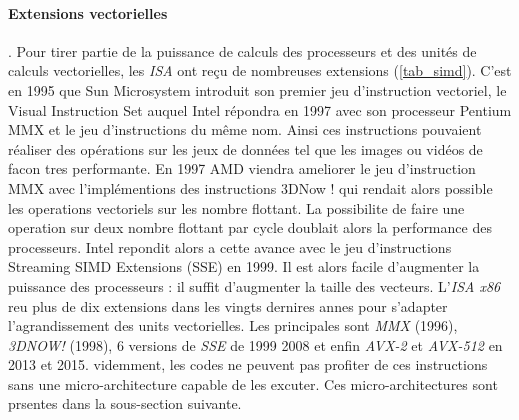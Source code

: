 \paragraph{Extensions vectorielles}.
Pour tirer partie de la puissance de calculs des processeurs et des unités de calculs vectorielles, les \textit{ISA} ont reçu de nombreuses extensions (\autoref{tab_simd}).
C'est en 1995 que Sun Microsystem introduit son premier jeu d'instruction vectoriel, le Visual Instruction Set auquel Intel répondra en 1997 avec son processeur Pentium MMX et le jeu d'instructions du même nom. Ainsi ces instructions pouvaient réaliser des opérations sur les jeux de données tel que les images ou vidéos de facon tres performante. En 1997 AMD viendra ameliorer le jeu d'instruction MMX avec l'implémentions des instructions 3DNow ! qui rendait alors possible les operations vectoriels sur les nombre flottant. La possibilite de faire une operation sur deux nombre flottant par cycle doublait alors la performance des processeurs. Intel repondit alors a cette avance avec le jeu d'instructions Streaming SIMD Extensions (SSE) en 1999. Il est alors facile d'augmenter la puissance des processeurs : il suffit d'augmenter la taille des vecteurs.
L'\textit{ISA x86} reu plus de dix extensions dans les vingts dernires annes pour s'adapter l'agrandissement des units vectorielles. Les principales sont \textit{MMX} (1996), \textit{3DNOW!} (1998), 6 versions de \textit{SSE} de 1999 2008 et enfin \textit{AVX-2} et \textit{AVX-512} en 2013 et 2015. videmment, les codes ne peuvent pas profiter de ces instructions sans une micro-architecture capable de les excuter. Ces micro-architectures sont prsentes dans la sous-section suivante. 


